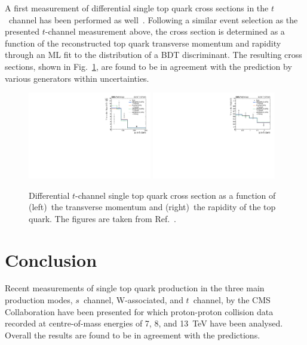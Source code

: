\documentclass{PoS}
\begin{document}
A first measurement of differential single top quark cross sections in the $t$~channel has been performed as well~\cite{tchdiff}. Following a similar event selection as the presented $t$-channel measurement above, the cross section is determined as a function of the reconstructed top quark transverse momentum and rapidity through an ML fit to the distribution of a BDT discriminant. The resulting cross sections, shown in Fig.~\ref{fig:t-channel-diff}, are found to be in agreement with the prediction by various generators within uncertainties.

\begin{figure}[!htb]
\begin{center}
\includegraphics[width=0.48\textwidth]{unfolded_top_pt.pdf}\hspace{0.02\textwidth}
\includegraphics[width=0.48\textwidth]{unfolded_top_y.pdf}
\caption{\label{fig:t-channel-diff}Differential $t$-channel single top quark cross section as a function of (left)~the transverse momentum and (right)~the rapidity of the top quark. The figures are taken from Ref.~\cite{tchdiff}.}
\end{center}
\end{figure}

\section{Conclusion}

Recent measurements of single top quark production in the three main production modes, $s$~channel, W-associated, and $t$~channel, by the CMS Collaboration have been presented for which proton-proton collision data recorded at centre-of-mass energies of 7, 8, and 13~TeV have been analysed. Overall the results are found to be in agreement with the predictions.
\end{document}
